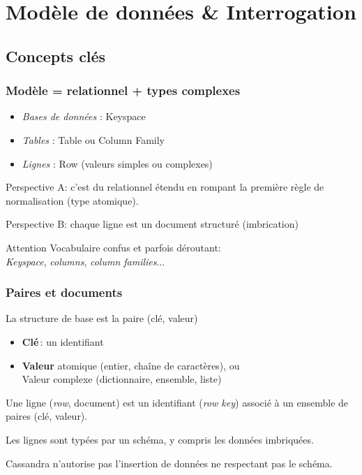 \section[Modèle \& Requêtes]{Modèle de données \& Interrogation}

\subsection[Concepts]{Concepts clés}
\begin{frame}
	\frametitle{Modèle = relationnel + types complexes}
	
	\begin{itemize}
		\item \textit{Bases de données} : \alert{Keyspace}
		\item \textit{Tables} : \alert{Table} ou \alert{Column Family}
		\item \textit{Lignes} : \alert{Row} (valeurs simples ou complexes)
	\end{itemize}
		
	\vfill
	
	\alert{Perspective A}: c'est du relationnel étendu en rompant la première règle de normalisation (type atomique).
	
	\vfill
	
	\alert{Perspective B}: chaque ligne est un document structuré (imbrication)
	
	\vfill
	
	\begin{block}{\danger Attention \danger}
		Vocabulaire confus et parfois déroutant: \\\textit{Keyspace}, \textit{columns}, \textit{column families}...
	\end{block}
	
\end{frame}


\begin{frame}
	\frametitle{Paires et documents}
	
	La structure de base est la paire (clé, valeur)
	
	\begin{itemize}
		\item \textbf{Clé}\,: un identifiant
		\item \textbf{Valeur} atomique (entier, chaîne de caractères), ou\\
		Valeur complexe (dictionnaire, ensemble, liste)
	\end{itemize}
	
	\vfill
	
	Une ligne (\textit{row}, document) est un identifiant (\textit{row key}) associé à un ensemble de paires (clé, valeur).
	
	\vfill
	
	Les lignes sont \alert{typées} par un schéma, y compris les données imbriquées.
	
	\vfill
	
	Cassandra n'autorise pas l'insertion de données ne respectant pas le schéma.
\end{frame}

